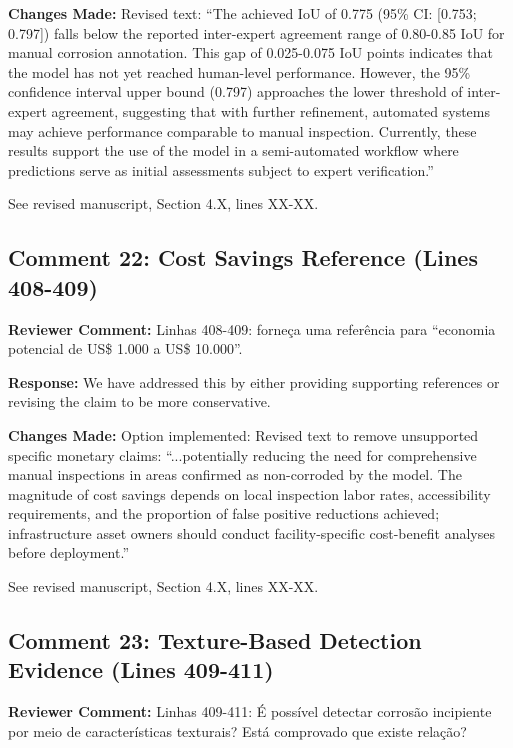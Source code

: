 \documentclass[11pt]{article}
\newcommand{\reviewercomment}[1]{\textcolor{reviewercolor}{\textbf{Reviewer Comment:} #1}}
\newcommand{\response}[1]{\textcolor{responsecolor}{\textbf{Response:} #1}}
\newcommand{\change}[1]{\textcolor{changecolor}{\textbf{Changes Made:} #1}}
\begin{document}
\change{Revised text: ``The achieved IoU of 0.775 (95\% CI: [0.753; 0.797]) falls below the reported inter-expert agreement range of 0.80-0.85 IoU for manual corrosion annotation. This gap of 0.025-0.075 IoU points indicates that the model has not yet reached human-level performance. However, the 95\% confidence interval upper bound (0.797) approaches the lower threshold of inter-expert agreement, suggesting that with further refinement, automated systems may achieve performance comparable to manual inspection. Currently, these results support the use of the model in a semi-automated workflow where predictions serve as initial assessments subject to expert verification.''

See revised manuscript, Section 4.X, lines XX-XX.}

\subsection{Comment 22: Cost Savings Reference (Lines 408-409)}

\reviewercomment{Linhas 408-409: forneça uma referência para ``economia potencial de US\$ 1.000 a US\$ 10.000''.}

\response{We have addressed this by either providing supporting references or revising the claim to be more conservative.}

\change{Option implemented: Revised text to remove unsupported specific monetary claims: ``...potentially reducing the need for comprehensive manual inspections in areas confirmed as non-corroded by the model. The magnitude of cost savings depends on local inspection labor rates, accessibility requirements, and the proportion of false positive reductions achieved; infrastructure asset owners should conduct facility-specific cost-benefit analyses before deployment.''

See revised manuscript, Section 4.X, lines XX-XX.}

\subsection{Comment 23: Texture-Based Detection Evidence (Lines 409-411)}

\reviewercomment{Linhas 409-411: É possível detectar corrosão incipiente por meio de características texturais? Está comprovado que existe relação?}
\end{document}
